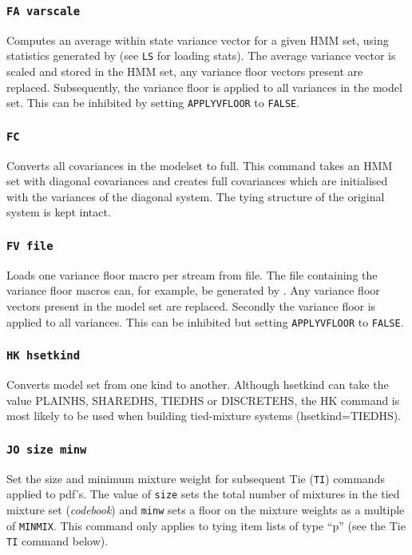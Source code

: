 \subsubsection*{\tt FA varscale}

Computes an average within state variance vector for a given HMM set,
using statistics generated by  (see {\tt LS} for loading
stats).  The average variance vector is scaled and stored in the HMM
set, any variance floor vectors present are replaced. Subsequently,
the variance floor is applied to all variances in the model set. This
can be inhibited by setting \texttt{APPLYVFLOOR} to \texttt{FALSE}.

\subsubsection*{\tt FC}

Converts all covariances in the modelset to full. This command
takes an HMM set with diagonal covariances and creates full
covariances which are initialised with the variances of the diagonal
system. The tying structure of the original system is kept intact.

\subsubsection*{\tt FV file} 

Loads one variance floor macro per stream from file. The file
containing the variance floor macros can, for example, be generated by
. Any variance floor vectors present in the model set
are replaced. Secondly the variance floor is applied to all variances.
This can be inhibited but setting \texttt{APPLYVFLOOR} to
\texttt{FALSE}.

\subsubsection*{\tt HK hsetkind}

Converts model set from one kind to another.  Although hsetkind can
take the value PLAINHS, SHAREDHS, TIEDHS or DISCRETEHS, the HK command is
most likely to be used when building tied-mixture systems (hsetkind=TIEDHS).

\subsubsection*{\tt JO size minw}

Set the size and minimum mixture weight for subsequent
Tie (\texttt{TI}) commands applied to pdf's.  
The value of \texttt{size} sets the total number of
mixtures in the tied mixture set ({\it codebook}) and \texttt{minw}
sets a floor on the mixture weights as a multiple of \texttt{MINMIX}.
This command only applies to tying item lists of type ``p''
(see the Tie \texttt{ TI} command below).

